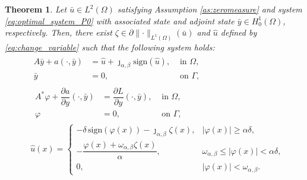 \documentclass[11pt,a4paper]{amsart}
\newcommand{\ds}{\displaystyle}
\newcommand{\om}{\Omega}
\newcommand{\ga}{\Gamma}
\newcommand{\sign}{\mathrm{sign}}
\newtheorem{theorem}{{Theorem}}
\newcommand{\norm}[1]{\lVert #1 \rVert}
\begin{document}
\begin{theorem} Let $\bar u \in L^2(\om)$ satisfying Assumption \ref{as:zeromeasure} and system \eqref{eq:optimal_system_P0} with associated state and adjoint state $\bar y\in H_0^1(\om)$, respectively. Then, there exist $\zeta \in \partial \norm{\cdot}_{L^1(\om)}(\bar u)$ and $\hat u$ defined by \eqref{eq:change_variable} such that the following system holds:
\begin{subequations}\label{eq:optimal_system_changed_variable}
	\begin{align}
&\begin{array}{rlc}
	A\bar y + a(\cdot, \bar y) & = \hat u + \jmath_{\alpha,\beta}\sign(\hat u), & \text{ in } \om, \\
      \bar y &= 0, & \text{ on } \ga, 
\end{array}\label{eq:optimal_system_P0_a}\\
%
&\,\begin{array}{rlc}
	A^*\varphi + \dfrac{\partial a}{\partial y}(\cdot,\bar y) & = \dfrac{\partial L}{\partial y}(\cdot,\bar y),& \text{ in } \om, \\
      \varphi &= 0, & \text{ on } \ga ,
\end{array} \label{eq:optimal_system_P0_b}\\
&\hat u(x)=\ds
\begin{cases} 
-\delta\,\sign(\varphi(x))-\jmath_{\alpha,\beta}\zeta(x), &|\varphi(x)|\ge \alpha \delta,\\
-\dfrac{\varphi(x)+\omega_{\alpha,\beta}\zeta(x)}{\alpha},&\omega_{\alpha,\beta}\le |\varphi(x)|<\alpha\delta,\\
0, &|\varphi(x)|<\omega_{\alpha,\beta}.
\end{cases}
\label{eq:optimal_system_P_d}
\end{align}
\end{subequations}	
\end{theorem}
\end{document}
